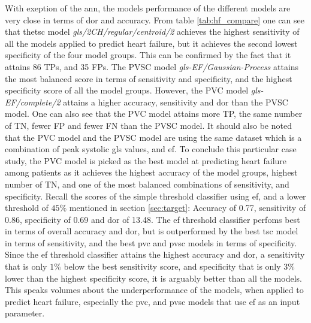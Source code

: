With exeption of the \acrshort{ann}, the models performance of the different models are very close in terms of \acrshort{dor} and accuracy. From table \ref{tab:hf_compare} one can see that the\acrshort{tsc} model \textit{gls/2CH/regular/centroid/2} achieves the highest sensitivity of all the models applied to predict heart failure, but it achieves the second lowest specificity of the four model groups. This can be confirmed by the fact that it attains 86 TPs, and 35 FPs. The PVSC model \textit{gls-EF/Gaussian-Process} attains the most balanced score in terms of sensitivity and specificity, and the highest specificity score of all the model groups. However, the PVC model \textit{gls-EF/complete/2} attains a higher accuracy, sensitivity and \acrshort{dor} than the PVSC model. One can also see that the PVC model attains more TP, the same number of TN, fewer FP and fewer FN than the PVSC model. It should also be noted that the PVC model and the PVSC model are using the same dataset which is a combination of peak systolic \acrshort{gls} values, and \acrshort{ef}. To conclude this particular case study, the PVC model is picked as the best model at predicting heart failure among patients as it achieves the highest accuracy of the model groups, highest number of TN, and one of the most balanced combinations of sensitivity, and specificity. Recall the scores of the simple threshold classifier using \acrshort{ef}, and a lower threshold of $45\%$ mentioned in section \ref{sec:target}: Accuracy of 0.77, sensitivity of 0.86, specificity of 0.69 and \acrshort{dor} of 13.48. The \acrshort{ef} threshold classifier perfoms best in terms of overall accuracy and \acrshort{dor}, but is outperformed by the best \acrshort{tsc} model in terms of sensitivity, and the best \acrshort{pvc} and \acrshort{pvsc} models in terms of specificity. Since the \acrshort{ef} threshold classifier attains the highest accuracy and \acrshort{dor}, a sensitivity that is only $1\%$ below the best sensitivity score, and specificity that is only $3\%$ lower than the highest specificity score, it is arguably better than all the models. This speaks volumes about the underperformance of the models, when applied to predict heart failure, especially the \acrshort{pvc}, and \acrshort{pvsc} models that use \acrshort{ef} as an input parameter. 

\newpage

